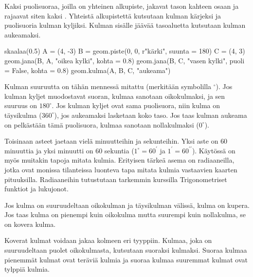 Kaksi puolisuoraa, joilla on yhteinen alkupiste, jakavat tason kahteen osaan ja rajaavat siten kaksi . Yhteistä alkupistettä
kutsutaan kulman kärjeksi ja puolisuoria kulman kyljiksi. Kulman sisälle jäävää tasoaluetta
kutsutaan kulman aukeamaksi.

\begin{center}
\begin{kuva}
	skaalaa(0.5)
	A = (4, -3)
	B = geom.piste(0, 0, r"k\"{a}rki", suunta = 180)
	C = (4, 3)
	geom.jana(B, A, "oikea kylki", kohta = 0.8)
	geom.jana(B, C, "vasen kylki", puoli = False, kohta = 0.8)
	geom.kulma(A, B, C, "aukeama")
\end{kuva}
\end{center}

Kulman suuruutta on tähän mennessä mitattu  (merkitään symbolilla $^{\circ}$). Jos kulman kyljet muodostavat suoran,
kulmaa sanotaan oikokulmaksi, ja sen suuruus on $180^{\circ}$.
Jos kulman kyljet ovat sama puolisuora, niin kulma on täysikulma ($360^{\circ}$), jos aukeamaksi lasketaan
koko taso. Jos taas kulman aukeama on pelkästään tämä puolisuora, kulmaa sanotaan
nollakulmaksi ($0^{\circ}$).

Toisinaan asteet jaetaan vielä minuutteihin ja sekunteihin. Yksi aste on $60$ minuuttia ja
yksi minuutti on $60$ sekuntia ($1^{\circ} = 60^{\prime}$ ja $1^{\prime} = 
60^{\prime \prime}$).
Käytössä on myös muitakin tapoja mitata kulmia. Erityisen tärkeä asema on radiaaneilla, jotka
ovat monissa tilanteissa luonteva tapa mitata kulmia vastaavien kaarten pituuksilla. Radiaaneihin
tutustutaan tarkemmin kurssilla Trigonometriset funktiot ja lukujonot.


Jos kulma on
suuruudeltaan oikokulman ja täysikulman välissä, kulma on kupera. Jos taas kulma on pienempi
kuin oikokulma mutta suurempi kuin nollakulma, se on kovera kulma.

Koverat kulmat voidaan jakaa kolmeen eri tyyppiin. Kulmaa, joka on suuruudeltaan puolet
oikokulmasta, kutsutaan suoraksi kulmaksi. Suoraa kulmaa pienemmät kulmat ovat teräviä
kulmia ja suoraa kulmaa suuremmat kulmat ovat tylppiä kulmia.

